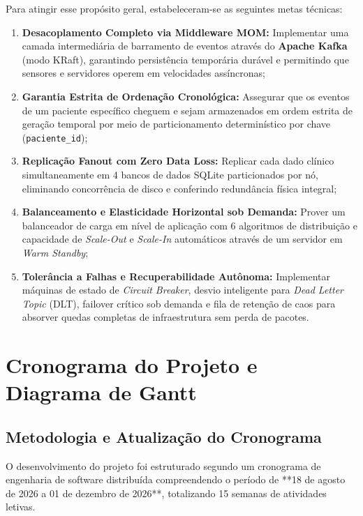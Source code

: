 \documentclass[12pt,a4paper]{article}
\begin{document}
Para atingir esse propósito geral, estabeleceram-se as seguintes metas técnicas:
\begin{enumerate}
	\item \textbf{Desacoplamento Completo via Middleware MOM:} Implementar uma camada intermediária de barramento de eventos através do \textbf{Apache Kafka} (modo KRaft), garantindo persistência temporária durável e permitindo que sensores e servidores operem em velocidades assíncronas;
	\item \textbf{Garantia Estrita de Ordenação Cronológica:} Assegurar que os eventos de um paciente específico cheguem e sejam armazenados em ordem estrita de geração temporal por meio de particionamento determinístico por chave (\texttt{paciente\_id});
	\item \textbf{Replicação Fanout com Zero Data Loss:} Replicar cada dado clínico simultaneamente em 4 bancos de dados SQLite particionados por nó, eliminando concorrência de disco e conferindo redundância física integral;
	\item \textbf{Balanceamento e Elasticidade Horizontal sob Demanda:} Prover um balanceador de carga em nível de aplicação com 6 algoritmos de distribuição e capacidade de \textit{Scale-Out} e \textit{Scale-In} automáticos através de um servidor em \textit{Warm Standby};
	\item \textbf{Tolerância a Falhas e Recuperabilidade Autônoma:} Implementar máquinas de estado de \textit{Circuit Breaker}, desvio inteligente para \textit{Dead Letter Topic} (DLT), failover crítico sob demanda e fila de retenção de caos para absorver quedas completas de infraestrutura sem perda de pacotes.
\end{enumerate}

\newpage

\section{Cronograma do Projeto e Diagrama de Gantt}
\label{sec:gantt}

\subsection{Metodologia e Atualização do Cronograma}
O desenvolvimento do projeto foi estruturado segundo um cronograma de engenharia de software distribuída compreendendo o período de **18 de agosto de 2026 a 01 de dezembro de 2026**, totalizando 15 semanas de atividades letivas.
\end{document}
